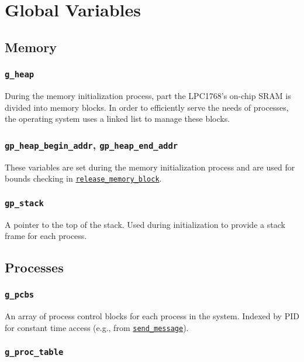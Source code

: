 \documentclass[12pt]{report}
\begin{document}
\chapter{Global Variables}

\section{Memory}

\subsection{\texttt{g_heap}}

During the memory initialization process, part the LPC1768's on-chip SRAM is divided into memory blocks. In order to efficiently serve the needs of processes, the operating system uses a linked list to manage these blocks.

\subsection{\texttt{gp_heap_begin_addr}, \texttt{gp_heap_end_addr}}

These variables are set during the memory initialization process and are used for bounds checking in \hyperref[alg:releasingmemoryblocks]{\texttt{release_memory_block}}.

\subsection{\texttt{gp_stack}}

A pointer to the top of the stack. Used during initialization to provide a stack frame for each process.

\section{Processes}

\subsection{\texttt{g_pcbs}}

An array of process control blocks for each process in the system. Indexed by PID for constant time access (e.g., from \hyperref[alg:sendingmessages]{\texttt{send_message}}).

\subsection{\texttt{g_proc_table}}
\end{document}
